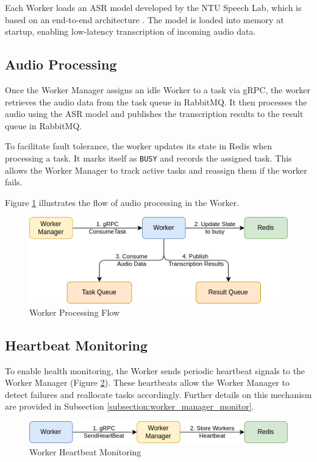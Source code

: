 Each Worker loads an ASR model developed by the NTU Speech Lab, which is based on an end-to-end architecture \cite{chng}. The model is loaded into memory at startup, enabling low-latency transcription of incoming audio data.

\subsection{Audio Processing}
Once the Worker Manager assigns an idle Worker to a task via gRPC, the worker retrieves the audio data from the task queue in RabbitMQ. It then processes the audio using the ASR model and publishes the transcription results to the result queue in RabbitMQ.  

To facilitate fault tolerance, the worker updates its state in Redis when processing a task. It marks itself as \texttt{BUSY} and records the assigned task. This allows the Worker Manager to track active tasks and reassign them if the worker fails.

Figure \ref{fig:worker_processing} illustrates the flow of audio processing in the Worker.
\begin{figure}[ht]
  \centering
  \includegraphics[width=.8\textwidth]{figures/worker_processing.drawio.png}
  \caption{Worker Processing Flow}
  \label{fig:worker_processing}
\end{figure}

\subsection{Heartbeat Monitoring}
To enable health monitoring, the Worker sends periodic heartbeat signals to the Worker Manager (Figure \ref{fig:worker_heartbeat}). These heartbeats allow the Worker Manager to detect failures and reallocate tasks accordingly. Further details on this mechanism are provided in Subsection \ref{subsection:worker_manager_monitor}.

\begin{figure}[ht]
  \centering
  \includegraphics[width=.8\textwidth]{figures/worker_heartbeat.drawio.png}
  \caption{Worker Heartbeat Monitoring}
  \label{fig:worker_heartbeat}
\end{figure}

